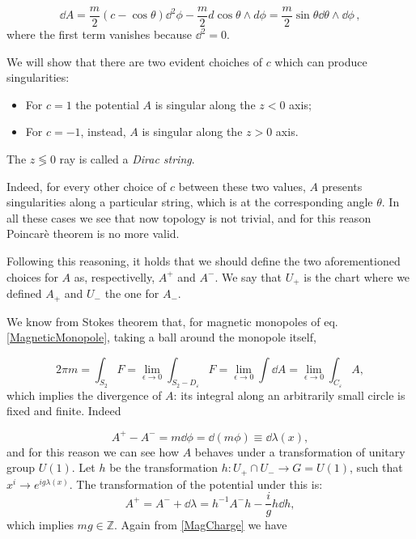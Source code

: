 \documentclass[main.tex]{subfiles}
\begin{document}
\begin{equation}
\dd{A}=\frac{m}{2}\left(c-\cos\theta\right)\dd^2\phi-\frac{m}{2}d\cos\theta\wedge d \phi=\frac{m}{2}\sin\theta \dd{\theta}\wedge \dd{\phi}\,,
\end{equation}
where the first term vanishes because \(\dd^2 = 0\).

We will show that there are two evident choiches of $c$ which can produce singularities:

\begin{itemize}
\item For $c=1$ the potential \(A\) is singular along the \(z<0\) axis;
\item For $c=-1$, instead, \(A\) is singular along the \(z>0\) axis.
\end{itemize}

The \(z \lessgtr 0\) ray is called a \emph{Dirac string}.

Indeed, for every other choice of $c$ between these two values, $A$ presents singularities along a particular string, which is at the corresponding angle $\theta$.
In all these cases we see that now topology is not trivial, and for this reason Poincarè theorem is no more valid.

Following this reasoning, it holds that we should define the two aforementioned choices for $A$ as, respectivelly, $A^+$ and $A^-$. We say that $U_+$ is the chart where we defined $A_+$ and $U_-$ the one for $A_-$.

We know from Stokes theorem that, for magnetic monopoles of eq.\eqref{MagneticMonopole}, taking a ball around the monopole itself,

\begin{equation}\label{MagCharge}
2\pi m=\int_{S_2} F=\lim_{\epsilon\to 0}\int_{S_2-D_{\varepsilon}}F=\lim_{\epsilon\to 0}\int \dd{A}=\lim_{\epsilon\to 0}\int_{C_{\varepsilon}} A,
\end{equation}
which implies the divergence of $A$: its integral along an arbitrarily small circle is fixed and finite.
Indeed

\begin{equation}
A^+-A^-=m\dd{\phi}=\dd{(m\phi)} \equiv \dd{\lambda(x)},
\end{equation}
%
and for this reason we can see how $A$ behaves under a transformation of unitary group $U(1)$.
Let $h$ be the transformation $h:U_+\cap U_- \to G=U(1)$, such that $x^i\to e^{ig\lambda(x)}$.
The transformation of the potential under this is:
%
\begin{equation}
A^+=A^-+\dd{\lambda}=h^{-1}A^-h-\frac{i}{g}h \dd{h},
\end{equation}
%
which implies $mg\in \mathbb{Z}$. Again from \eqref{MagCharge} we have
\end{document}
